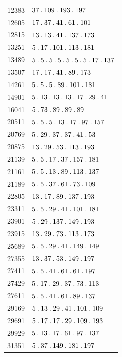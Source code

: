 \begin{longtable}{@{}r|l@{}}
12383 & $37\pdot 109\pdot 193\pdot 197$\\
12605 & $17\pdot 37\pdot 41\pdot 61\pdot 101$\\
12815 & $13\pdot 13\pdot 41\pdot 137\pdot 173$\\
13251 & $5\pdot 17\pdot 101\pdot 113\pdot 181$\\
13489 & $5\pdot 5\pdot 5\pdot 5\pdot 5\pdot 5\pdot 5\pdot 17\pdot 137$\\
13507 & $17\pdot 17\pdot 41\pdot 89\pdot 173$\\
14261 & $5\pdot 5\pdot 5\pdot 89\pdot 101\pdot 181$\\
14901 & $5\pdot 13\pdot 13\pdot 13\pdot 17\pdot 29\pdot 41$\\
16041 & $5\pdot 73\pdot 89\pdot 89\pdot 89$\\
20511 & $5\pdot 5\pdot 5\pdot 13\pdot 17\pdot 97\pdot 157$\\
20769 & $5\pdot 29\pdot 37\pdot 37\pdot 41\pdot 53$\\
20875 & $13\pdot 29\pdot 53\pdot 113\pdot 193$\\
21139 & $5\pdot 5\pdot 17\pdot 37\pdot 157\pdot 181$\\
21161 & $5\pdot 5\pdot 13\pdot 89\pdot 113\pdot 137$\\
21189 & $5\pdot 5\pdot 37\pdot 61\pdot 73\pdot 109$\\
22805 & $13\pdot 17\pdot 89\pdot 137\pdot 193$\\
23311 & $5\pdot 5\pdot 29\pdot 41\pdot 101\pdot 181$\\
23901 & $5\pdot 29\pdot 137\pdot 149\pdot 193$\\
23915 & $13\pdot 29\pdot 73\pdot 113\pdot 173$\\
25689 & $5\pdot 5\pdot 29\pdot 41\pdot 149\pdot 149$\\
27355 & $13\pdot 37\pdot 53\pdot 149\pdot 197$\\
27411 & $5\pdot 5\pdot 41\pdot 61\pdot 61\pdot 197$\\
27429 & $5\pdot 17\pdot 29\pdot 37\pdot 73\pdot 113$\\
27611 & $5\pdot 5\pdot 41\pdot 61\pdot 89\pdot 137$\\
29169 & $5\pdot 13\pdot 29\pdot 41\pdot 101\pdot 109$\\
29691 & $5\pdot 17\pdot 17\pdot 29\pdot 109\pdot 193$\\
29929 & $5\pdot 13\pdot 17\pdot 61\pdot 97\pdot 137$\\
31351 & $5\pdot 37\pdot 149\pdot 181\pdot 197$\\

\end{longtable}
